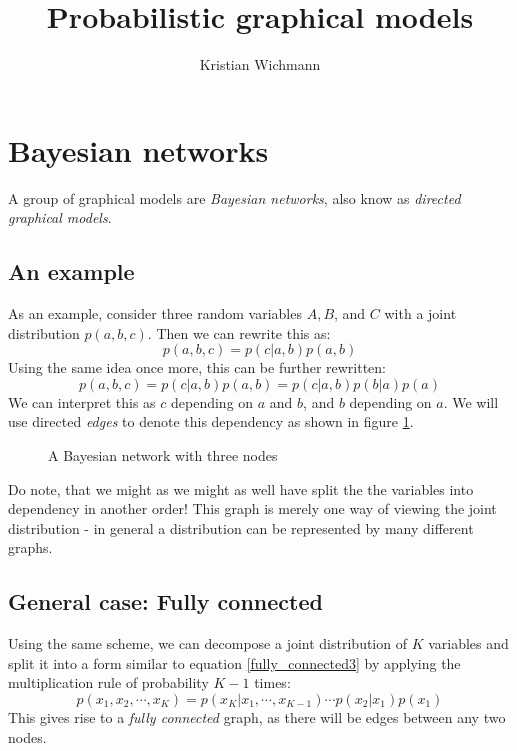 \documentclass[12pt, a4paper]{article}
\title{Probabilistic graphical models}
\author{Kristian Wichmann}
\numberwithin{equation}{section}
\begin{document}
\maketitle

\section{Bayesian networks}
A group of graphical models are \textit{Bayesian networks}, also know as \textit{directed graphical models}.

\subsection{An example}
As an example, consider three random variables $A, B$, and $C$ with a joint distribution $p(a,b,c)$. Then we can rewrite this as:
\begin{equation}
p(a,b,c)=p(c|a,b)p(a,b)
\end{equation}
Using the same idea once more, this can be further rewritten:
\begin{equation}
p(a,b,c)=p(c|a,b)p(a,b)=p(c|a,b)p(b|a)p(a)
\label{fully_connected3}
\end{equation}
We can interpret this as $c$ depending on $a$ and $b$, and $b$ depending on $a$. We will use directed \textit{edges} to denote this dependency as shown in figure \ref{graph:bn3}.

\begin{figure}
\centering
{}
\caption{A Bayesian network with three nodes}
\label{graph:bn3}
\end{figure}

Do note, that we might as we might as well have split the the variables into dependency in another order! This graph is merely one way of viewing the joint distribution - in general a distribution can be represented by many different graphs.

\subsection{General case: Fully connected}
Using the same scheme, we can decompose a joint distribution of $K$ variables and split it into a form similar to equation \ref{fully_connected3} by applying the multiplication rule of probability $K-1$ times:
\begin{equation}
p(x_1,x_2,\cdots,x_K)=p(x_K|x_1,\cdots,x_{K-1})\cdots p(x_2|x_1)p(x_1)
\label{fully_connectedK}
\end{equation}
This gives rise to a \textit{fully connected} graph, as there will be edges between any two nodes. 
\end{document}
